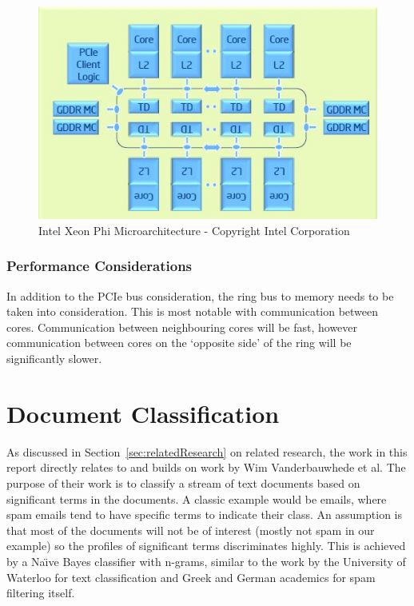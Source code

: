 \begin{figure}[H]
\includegraphics[width=\linewidth]{images/intelXeonPhiMicroarchitecture.jpg}
\caption{Intel Xeon Phi Microarchitecture - Copyright Intel Corporation \textcopyright}
\label{fig:phiMicroarchitecture}
\end{figure}

\subsubsection{Performance Considerations}

In addition to the PCIe bus consideration, the ring bus to memory needs to be
taken into consideration. This is most notable with communication between cores.
Communication between neighbouring cores will be fast, however communication
between cores on the `opposite side' of the ring will be significantly slower.

\section{Document Classification}

As discussed in Section~\ref{sec:relatedResearch} on related research, the work
in this report directly relates to and builds on work by Wim Vanderbauwhede et
al. The purpose of their work is to classify a stream of text documents based on
significant terms in the documents. A classic example would be emails, where
spam emails tend to have specific terms to indicate their class. An assumption
is that most of the documents will not be of interest (mostly not spam in our
example) so the profiles of significant terms discriminates highly. This is
achieved by a Na{\"{\i}}ve Bayes classifier with n-grams, similar to the work by
the University of Waterloo \cite{peng2003combining} for text classification and
Greek \cite{metsis2006spam} and German \cite{Schneider:2003:CEM:1067807.1067848}
academics for spam filtering itself.

